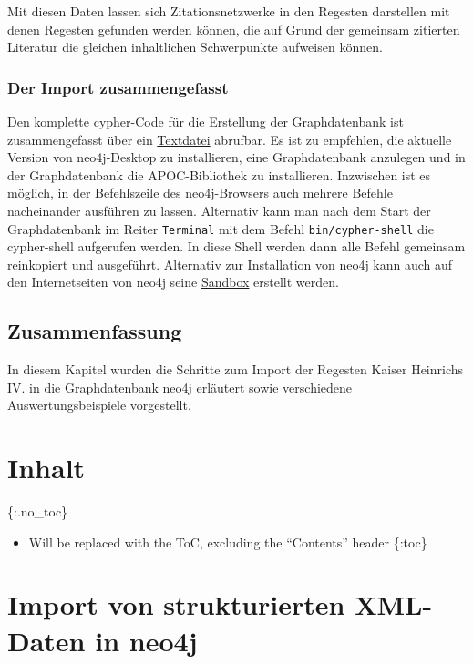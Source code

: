 \documentclass[ngerman,]{scrreprt}
\providecommand{\tightlist}{%
  \setlength{\itemsep}{0pt}\setlength{\parskip}{0pt}}
\begin{document}
Mit diesen Daten lassen sich Zitationsnetzwerke in den Regesten darstellen mit denen Regesten gefunden werden können, die auf Grund der gemeinsam zitierten Literatur die gleichen inhaltlichen Schwerpunkte aufweisen können.

\subsection{Der Import zusammengefasst}\label{der-import-zusammengefasst}

Den komplette \href{cypher/20_cypher-Datenbankerstellung.txt}{cypher-Code} für die Erstellung der Graphdatenbank ist zusammengefasst über ein \href{cypher/20_cypher-Datenbankerstellung.txt}{Textdatei} abrufbar. Es ist zu empfehlen, die aktuelle Version von neo4j-Desktop zu installieren, eine Graphdatenbank anzulegen und in der Graphdatenbank die APOC-Bibliothek zu installieren. Inzwischen ist es möglich, in der Befehlszeile des neo4j-Browsers auch mehrere Befehle nacheinander ausführen zu lassen. Alternativ kann man nach dem Start der Graphdatenbank im Reiter \texttt{Terminal} mit dem Befehl \texttt{bin/cypher-shell} die cypher-shell aufgerufen werden. In diese Shell werden dann alle Befehl gemeinsam reinkopiert und ausgeführt. Alternativ zur Installation von neo4j kann auch auf den Internetseiten von neo4j seine \href{https://neo4j.com/lp/try-neo4j-sandbox}{Sandbox} erstellt werden.

\section{Zusammenfassung}\label{zusammenfassung-2}

In diesem Kapitel wurden die Schritte zum Import der Regesten Kaiser Heinrichs IV. in die Graphdatenbank neo4j erläutert sowie verschiedene Auswertungsbeispiele vorgestellt.

\chapter{Inhalt}\label{inhalt-4}

\{:.no\_toc\}

\begin{itemize}
\tightlist
\item
  Will be replaced with the ToC, excluding the ``Contents'' header \{:toc\}
\end{itemize}

\chapter{Import von strukturierten XML-Daten in neo4j}\label{import-von-strukturierten-xml-daten-in-neo4j}
\end{document}
